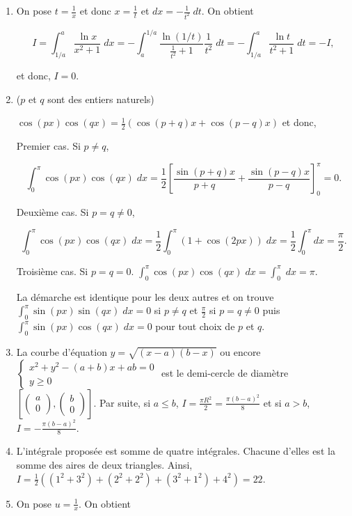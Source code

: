 \documentclass[11pt,a4paper]{article}
\begin{document}
\begin{enumerate}
\item  On pose $t=\frac{1}{x}$ et donc $x=\frac{1}{t}$ et $dx=-\frac{1}{t^2}\;dt$. On obtient

$$I=\int_{1/a}^{a}\frac{\ln x}{x^2+1}\;dx=-\int_{a}^{1/a}\frac{\ln(1/t)}{\frac{1}{t^2}+1}\frac{1}{t^2}\;dt=-\int_{1/a}^{a}\frac{\ln t}{t^2+1}\;dt=-I,$$

et donc, $I=0$.

\item  ($p$ et $q$ sont des entiers naturels)

$\cos(px)\cos(qx)=\frac{1}{2}(\cos(p+q)x+\cos(p-q)x)$ et donc,

Premier cas. Si $p\neq q$,

$$\int_{0}^{\pi}\cos(px)\cos(qx)\;dx=\frac{1}{2}\left[\frac{\sin(p+q)x}{p+q}+\frac{\sin(p-q)x}{p-q}\right]_{0}^{\pi}=0.$$

Deuxième cas. Si $p=q\neq0$,

$$\int_{0}^{\pi}\cos(px)\cos(qx)\;dx=\frac{1}{2}\int_{0}^{\pi}(1+\cos(2px))\;dx=\frac{1}{2}\int_{0}^{\pi}dx=\frac{\pi}{2}.$$

Troisième cas. Si $p=q=0$. $\int_{0}^{\pi}\cos(px)\cos(qx)\;dx=\int_{0}^{\pi}\;dx=\pi$.

La démarche est identique pour les deux autres et on trouve $\int_{0}^{\pi}\sin(px)\sin(qx)\;dx=0$ si $p\neq q$ et $\frac{\pi}{2}$ si $p=q\neq0$ puis $\int_{0}^{\pi}\sin(px)\cos(qx)\;dx=0$ pour tout choix de $p$ et $q$.

\item  La courbe d'équation $y=\sqrt{(x-a)(b-x)}$ ou encore $\left\{
\begin{array}{l}
x^2+y^2-(a+b)x+ab=0\\
y\geq0
\end{array}
\right.$ est le demi-cercle de diamètre $[\left(\begin{array}{c}
a\\
0
\end{array}
\right),\left(\begin{array}{c}
b\\
0
\end{array}
\right)]$. Par suite, si $a\leq b$, $I=\frac{\pi R^2}{2}=\frac{\pi(b-a)^2}{8}$ et si $a>b$, $I=-\frac{\pi(b-a)^2}{8}$.

\item  L'intégrale proposée est somme de quatre intégrales. Chacune d'elles est la somme des aires de deux triangles. Ainsi, $I=\frac{1}{2}((1^2+3^2)+(2^2+2^2)+(3^2+1^2)+4^2)=22$.
\item  On pose $u=\frac{1}{x}$. On obtient


\end{enumerate}
\end{document}
